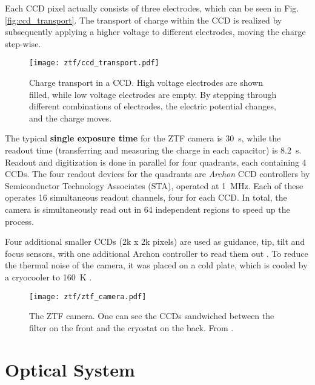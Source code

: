 Each CCD pixel actually consists of three electrodes, which can be seen in Fig. \ref{fig:ccd_transport}. The transport of charge within the CCD is realized by subsequently applying a higher voltage to different electrodes, moving the charge step-wise. 

\begin{figure}[htb]
    \texttt{[image: ztf/ccd\_transport.pdf]}
    \caption[Charge transport in a CCD]{Charge transport in a CCD. High voltage electrodes are shown filled, while low voltage electrodes are empty. By stepping through different combinations of electrodes, the electric potential changes, and the charge moves.}
\end{figure}

The typical \textbf{single exposure time} for the ZTF camera is \SI{30}{\second}, while the readout time (transferring and measuring the charge in each capacitor) is \SI{8.2}{\second}. Readout and digitization is done in parallel for four quadrants, each containing 4 CCDs. The four readout devices for the quadrants are \textit{Archon} CCD controllers by Semiconductor Technology Associates (STA), operated at \SI{1}{\mega\Hz}. Each of these operates 16 simultaneous readout channels, four for each CCD. In total, the camera is simultaneously read out in 64 independent regions to speed up the process.

Four additional smaller CCDs (2k x 2k pixels) are used as guidance, tip, tilt and focus sensors, with one additional Archon controller to read them out . To reduce the thermal noise of the camera, it was placed on a cold plate, which is cooled by a cryocooler to \SI{160}{\kelvin} \cite{Dekany2016}.

\begin{figure}[htb]
    \texttt{[image: ztf/ztf\_camera.pdf]}
    \caption[ZTF camera]{The ZTF camera. One can see the CCDs sandwiched between the filter on the front and the cryostat on the back. From \cite{Bellm2019}.}
\end{figure}

\section{Optical System}

